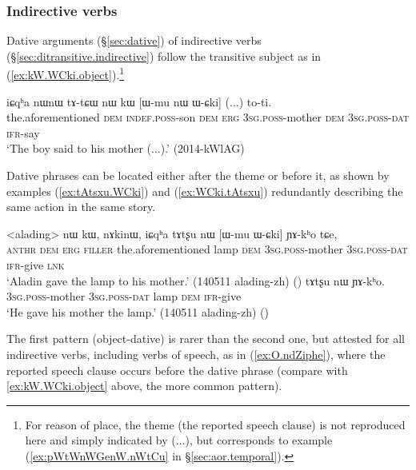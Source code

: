\subsubsection{Indirective verbs} \label{sec:indirective.word.order}
Dative arguments (§\ref{sec:dative}) of indirective verbs (§\ref{sec:ditransitive.indirective}) follow the transitive subject as in (\ref{ex:kW.WCki.object}).\footnote{For reason of place, the theme (the reported speech clause) is not reproduced here and simply indicated by (...), but corresponds to example (\ref{ex:pWtWnWGenW.nWtCu} in §\ref{sec:aor.temporal}). }

\begin{exe}
\ex \label{ex:kW.WCki.object}
\gll  iɕqʰa nɯnɯ tɤ-tɕɯ nɯ kɯ [ɯ-mu nɯ ɯ-ɕki] (...) to-ti. \\
the.aforementioned \textsc{dem} \textsc{indef}.\textsc{poss}-son \textsc{dem} \textsc{erg} \textsc{3sg}.\textsc{poss}-mother \textsc{dem} \textsc{3sg}.\textsc{poss}-\textsc{dat} {  } \textsc{ifr}-say \\
\glt `The boy said to his mother (...).' (2014-kWlAG)
\end{exe}

Dative phrases can be located either after the theme or before it, as shown by examples (\ref{ex:tAtsxu.WCki}) and (\ref{ex:WCki.tAtsxu}) redundantly describing the same action in the same story. 

\begin{exe}
\ex 
\begin{xlist}
\ex \label{ex:tAtsxu.WCki}
\gll  <alading> nɯ kɯ, nɤkinɯ, iɕqʰa tɤtʂu nɯ [ɯ-mu ɯ-ɕki] ɲɤ-kʰo tɕe, \\
\textsc{anthr} \textsc{dem} \textsc{erg} \textsc{filler} the.aforementioned lamp \textsc{dem} \textsc{3sg}.\textsc{poss}-mother  \textsc{3sg}.\textsc{poss}-\textsc{dat} \textsc{ifr}-give \textsc{lnk} \\
\glt `Aladin gave the lamp to his mother.' (140511 alading-zh)
()
\ex \label{ex:WCki.tAtsxu}
\gll  [ɯ-mu ɯ-ɕki] tɤtʂu nɯ ɲɤ-kʰo. \\
\textsc{3sg}.\textsc{poss}-mother \textsc{3sg}.\textsc{poss}-\textsc{dat} lamp \textsc{dem} \textsc{ifr}-give \\
\glt `He gave his mother the lamp.' (140511 alading-zh)
()
\end{xlist}
\end{exe}

The first pattern (object-dative) is rarer than the second one, but attested for all indirective verbs, including verbs of speech, as in (\ref{ex:O.ndZiphe}), where the reported speech clause occurs before the dative phrase (compare with \ref{ex:kW.WCki.object} above, the more common pattern).

